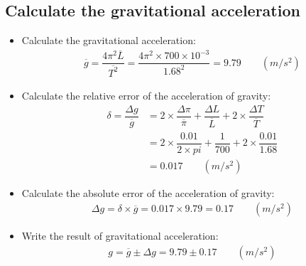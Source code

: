\documentclass[12pt, a4paper]{article}
\newcommand{\mul}{\times}
\newcommand{\avg}{\overline}
\newcommand{\Dt}{\Delta}
\newcommand{\hii}{\subsection}
\begin{document}
    \hii{Calculate the gravitational acceleration}
        \begin{itemize}
            \item Calculate the gravitational acceleration:
                \begin{align*}
                    \avg{g} = \dfrac{4 \pi^{2} \avg{L}}{\avg{T^{2}}}
                    = \dfrac{4 \pi^{2} \mul 700 \mul 10^{-3}}{1.68^{2}} = 9.79 \qquad (m/s^{2})
                \end{align*}
            \item Calculate the relative error of the acceleration of gravity:
                \begin{align*}
                    \delta = \dfrac{\Dt g}{\avg{g}}
                    & = 2 \mul \dfrac{\Dt \pi}{\avg{\pi}} + \dfrac{\Dt L}{\avg{L}} + 2 \mul \dfrac{\Dt T}{\avg{T}} \\
                    & = 2 \mul \dfrac{0.01}{2 \mul pi} + \dfrac{1}{700} + 2 \mul \dfrac{0.01}{1.68} \\
                    & = 0.017 \qquad (m/s^{2})
                \end{align*}
            \item Calculate the absolute error of the acceleration of gravity:
                \begin{align*}
                    \Dt g = \delta \mul \avg{g} = 0.017 \mul 9.79 = 0.17 \qquad (m/s^{2})
                \end{align*}
            \item Write the result of gravitational acceleration:
                \begin{align*}
                    g = \avg{g} \pm \Dt g = 9.79 \pm 0.17 \qquad (m/s^{2})
                \end{align*}
        \end{itemize}
\end{document}
